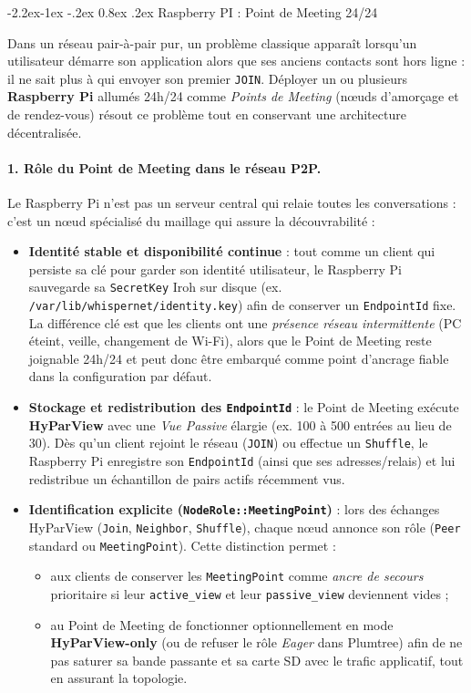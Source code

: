 \documentclass[11pt,a4paper]{article}
\makeatletter
\renewcommand\subsubsection{\@startsection{subsubsection}{3}{\z@}%
                                     {-2.2ex\@plus -1ex \@minus -.2ex}%
                                     {0.8ex \@plus .2ex}%
                                     {\normalfont\normalsize\bfseries\color{AccentTeal}}}
\makeatother
\begin{document}
\subsubsection{Raspberry PI : Point de Meeting 24/24}

Dans un réseau pair-à-pair pur, un problème classique apparaît lorsqu'un utilisateur démarre son application alors que ses anciens contacts sont hors ligne : il ne sait plus à qui envoyer son premier \texttt{JOIN}. Déployer un ou plusieurs \textbf{Raspberry Pi} allumés 24h/24 comme \emph{Points de Meeting} (nœuds d'amorçage et de rendez-vous) résout ce problème tout en conservant une architecture décentralisée.

\paragraph{1. Rôle du Point de Meeting dans le réseau P2P.}
Le Raspberry Pi n'est pas un serveur central qui relaie toutes les conversations : c'est un nœud spécialisé du maillage qui assure la découvrabilité :
\begin{itemize}
    \item \textbf{Identité stable et disponibilité continue} : tout comme un client qui persiste sa clé pour garder son identité utilisateur, le Raspberry Pi sauvegarde sa \texttt{SecretKey} Iroh sur disque (ex. \texttt{/var/lib/whispernet/identity.key}) afin de conserver un \texttt{EndpointId} fixe. La différence clé est que les clients ont une \emph{présence réseau intermittente} (PC éteint, veille, changement de Wi-Fi), alors que le Point de Meeting reste joignable 24h/24 et peut donc être embarqué comme point d'ancrage fiable dans la configuration par défaut.
    \item \textbf{Stockage et redistribution des \texttt{EndpointId}} : le Point de Meeting exécute \textbf{HyParView} avec une \emph{Vue Passive} élargie (ex. 100 à 500 entrées au lieu de 30). Dès qu'un client rejoint le réseau (\texttt{JOIN}) ou effectue un \texttt{Shuffle}, le Raspberry Pi enregistre son \texttt{EndpointId} (ainsi que ses adresses/relais) et lui redistribue un échantillon de pairs actifs récemment vus.
    \item \textbf{Identification explicite (\texttt{NodeRole::MeetingPoint})} : lors des échanges HyParView (\texttt{Join}, \texttt{Neighbor}, \texttt{Shuffle}), chaque nœud annonce son rôle (\texttt{Peer} standard ou \texttt{MeetingPoint}). Cette distinction permet :
    \begin{itemize}
        \item aux clients de conserver les \texttt{MeetingPoint} comme \emph{ancre de secours} prioritaire si leur \texttt{active\_view} et leur \texttt{passive\_view} deviennent vides ;
        \item au Point de Meeting de fonctionner optionnellement en mode \textbf{HyParView-only} (ou de refuser le rôle \emph{Eager} dans Plumtree) afin de ne pas saturer sa bande passante et sa carte SD avec le trafic applicatif, tout en assurant la topologie.
    \end{itemize}
\end{itemize}
\end{document}
